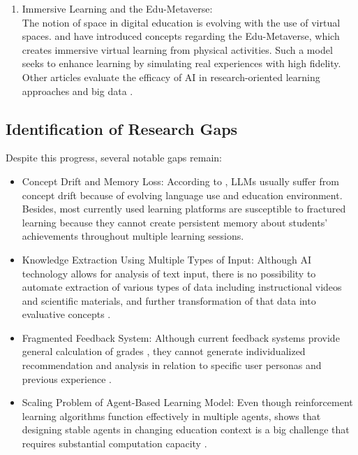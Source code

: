 \documentclass[conference]{IEEEtran}
\begin{document}
\begin{enumerate}
	\item Immersive Learning and the Edu-Metaverse: \\
	The notion of space in digital education is evolving with the use of virtual spaces. \textcite{illi2025} and \textcite{teichmann2025} have introduced concepts regarding the Edu-Metaverse, which creates immersive virtual learning from physical activities. Such a model seeks to enhance learning by simulating real experiences with high fidelity. Other articles evaluate the efficacy of AI in research-oriented learning approaches \cite{festiyed2026} and big data \cite{bakhouyi2025}.
\end{enumerate}

\subsection{Identification of Research Gaps}

Despite this progress, several notable gaps remain:

\begin{itemize}
	\item Concept Drift and Memory Loss: According to \textcite{hajmohammed2025}, LLMs usually suffer from concept drift because of evolving language use and education environment. Besides, most currently used learning platforms are susceptible to fractured learning because they cannot create persistent memory about students’ achievements throughout multiple learning sessions.
	\item Knowledge Extraction Using Multiple Types of Input: Although AI technology allows for analysis of text input, there is no possibility to automate extraction of various types of data including instructional videos and scientific materials, and further transformation of that data into evaluative concepts \cite{pradeesh2025, lopez2025}.
	\item Fragmented Feedback System: Although current feedback systems provide general calculation of grades \cite{mallik2023}, they cannot generate individualized recommendation and analysis in relation to specific user personas and previous experience \cite{hasan2020}.
	\item Scaling Problem of Agent-Based Learning Model: Even though reinforcement learning algorithms function effectively in multiple agents, \textcite{nguyen2020} shows that designing stable agents in changing education context is a big challenge that requires substantial computation capacity \cite{boldo2024}.
\end{itemize}
\end{document}
